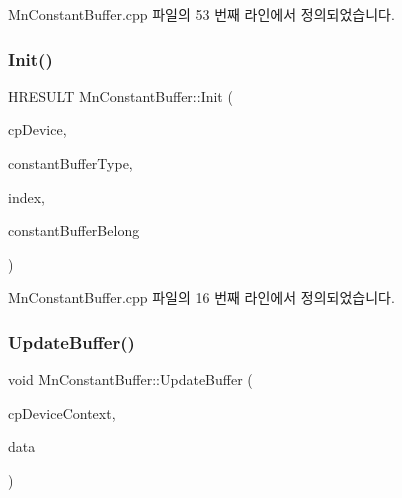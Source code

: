 Mn\+Constant\+Buffer.\+cpp 파일의 53 번째 라인에서 정의되었습니다.

\mbox{\label{class_m_n_l_1_1_mn_constant_buffer_a16b6059a895eb7da76323aaffe61e915}} 
\subsubsection{\texorpdfstring{Init()}{Init()}}
{\footnotesize\ttfamily H\+R\+E\+S\+U\+LT Mn\+Constant\+Buffer\+::\+Init (\begin{DoxyParamCaption}\item[{const \hyperlink{namespace_m_n_l_a1eec210db8f309a4a9ac0d9658784c31}{C\+P\+D3\+D\+Device} \&}]{cp\+Device,  }\item[{const std\+::shared\+\_\+ptr$<$ \hyperlink{class_m_n_l_1_1_mn_constant_buffer_type}{Mn\+Constant\+Buffer\+Type} $>$ \&}]{constant\+Buffer\+Type,  }\item[{U\+I\+NT}]{index,  }\item[{const \hyperlink{namespace_m_n_l_a3f526411258a17023ecac1a36e666d42}{M\+N\+\_\+\+C\+O\+N\+S\+T\+A\+N\+T\+\_\+\+B\+U\+F\+F\+E\+R\+\_\+\+B\+E\+L\+O\+NG} \&}]{constant\+Buffer\+Belong }\end{DoxyParamCaption})}



Mn\+Constant\+Buffer.\+cpp 파일의 16 번째 라인에서 정의되었습니다.

\mbox{\label{class_m_n_l_1_1_mn_constant_buffer_a35ca3bffb4e5a497fe2303b1fa3abae4}} 
\subsubsection{\texorpdfstring{Update\+Buffer()}{UpdateBuffer()}}
{\footnotesize\ttfamily void Mn\+Constant\+Buffer\+::\+Update\+Buffer (\begin{DoxyParamCaption}\item[{\hyperlink{namespace_m_n_l_aab3aabb6c9360e44ddc8b0bb563c2107}{C\+P\+D3\+D\+Device\+Context}}]{cp\+Device\+Context,  }\item[{const D3\+D11\+\_\+\+S\+U\+B\+R\+E\+S\+O\+U\+R\+C\+E\+\_\+\+D\+A\+TA \&}]{data }\end{DoxyParamCaption})}

